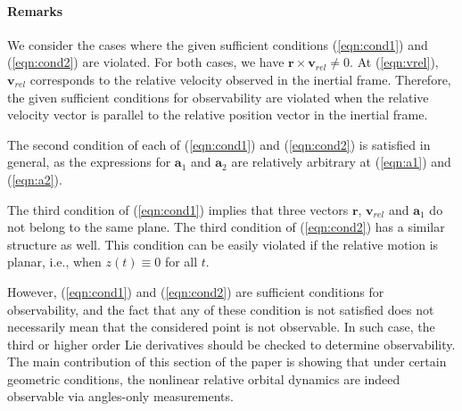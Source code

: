 \documentclass[letterpaper, paper,10pt]{AAS}		%
\newcommand{\refeqn}[1]{(\ref{eqn:#1})}
\renewcommand{\r}{\mathbf{r}}
\begin{document}
\paragraph{Remarks} We consider the cases where the given sufficient conditions \refeqn{cond1} and \refeqn{cond2} are violated. 
For both cases, we have $\r\times\mathbf{v}_{rel}\neq 0$. At \refeqn{vrel}, $\mathbf{v}_{rel}$ corresponds to the relative velocity observed in the inertial frame. Therefore, the given sufficient conditions for observability are violated when the relative velocity vector is parallel to the relative position vector in the inertial frame. 

The second condition of each of \refeqn{cond1} and \refeqn{cond2} is satisfied in general, as the expressions for $\mathbf{a}_1$ and $\mathbf{a}_2$ are relatively arbitrary at \refeqn{a1} and \refeqn{a2}. 

The third condition of \refeqn{cond1} implies that three vectors $\r$, $\mathbf{v}_{rel}$ and $\mathbf{a}_1$ do not belong to the same plane. The third condition of \refeqn{cond2} has a similar structure as well. This condition can be easily violated if the relative motion is planar, i.e., when $z(t)\equiv 0$ for all $t$. 

However, \refeqn{cond1} and \refeqn{cond2} are sufficient conditions for observability, and the fact that any of these condition is not satisfied does not necessarily mean that the considered point is not observable. In such case, the third or higher order Lie derivatives should be checked to determine observability. The main contribution of this section of the paper is showing that under certain geometric conditions, the nonlinear relative orbital dynamics are indeed observable via angles-only measurements.
\end{document}
